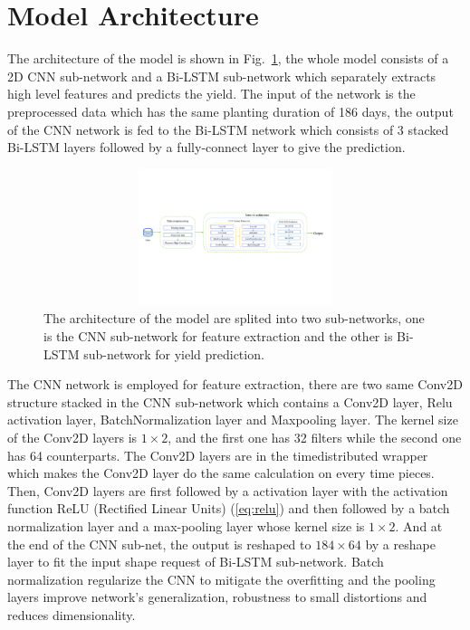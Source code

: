 \documentclass[conference, a4paper]{IEEEtran}
\begin{document}
    \section{Model Architecture} \label{sec:Arch}
      The architecture of the model is shown in Fig.~\ref{fig:arch}, the whole model consists of a 2D CNN sub-network and a Bi-LSTM sub-network which separately extracts high level features and predicts the yield. The input of the network is the preprocessed data which has the same planting duration of 186 days, the output of the CNN network is fed to the Bi-LSTM network which consists of 3 stacked Bi-LSTM layers followed by a fully-connect layer to give the prediction.

      \begin{figure}[tb]
        \centering
        \includegraphics[width=18cm,height=4cm]{figures/new_arch.pdf}
        \caption{The architecture of the model are splited into two sub-networks, one is the CNN sub-network for feature extraction and the other is Bi-LSTM sub-network for yield prediction.}
        \label{fig:arch}
      \end{figure}

      The CNN network is employed for feature extraction, there are two same Conv2D structure stacked in the CNN sub-network which contains a Conv2D layer, Relu activation layer, BatchNormalization layer and Maxpooling layer. The kernel size of the Conv2D layers is $1\times2$, and the first one has 32 filters while the second one has 64 counterparts. The Conv2D layers are in the timedistributed wrapper which makes the Conv2D layer do the same calculation on every time pieces. Then, Conv2D layers are first followed by a activation layer with the activation function ReLU (Rectified Linear Units) (\ref{eq:relu}) and then followed by a batch normalization layer and a max-pooling layer whose kernel size is $1\times2$. And at the end of the CNN sub-net, the output is reshaped to $184\times64$ by a reshape layer to fit the input shape request of Bi-LSTM sub-network. Batch normalization regularize the CNN to mitigate the overfitting and the pooling layers improve network's generalization, robustness to small distortions and reduces dimensionality.
\end{document}

